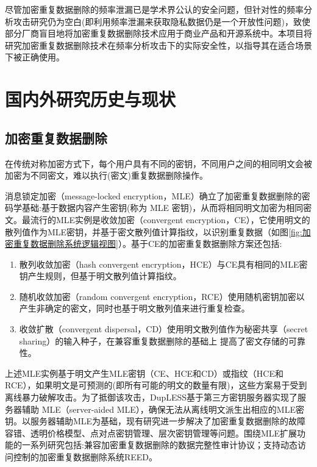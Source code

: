 尽管加密重复数据删除的频率泄漏已是学术界公认的安全问题，但针对性的频率分析攻击研究仍为空白(即利用频率泄漏来获取隐私数据仍是一个开放性问题)，致使部分厂商盲目地将加密重复数据删除技术应用于商业产品和开源系统中。本项目将研究加密重复数据删除技术在频率分析攻击下的实际安全性，以指导其在适合场景下被正确使用。


\section{国内外研究历史与现状}

\subsection{加密重复数据删除}
\label{sec:加密重复数据删除}
在传统对称加密方式下，每个用户具有不同的密钥，不同用户之间的相同明文会被加密为不同密文，难以执行(密文)重复数据删除操作。

消息锁定加密（message-locked encryption，MLE）确立了加密重复数据删除的密码学基础:基于数据内容产生密钥(称为 MLE 密钥)，从而将相同明文加密为相同密文。最流行的MLE实例是收敛加密（convergent encryption，CE），它使用明文的散列值作为MLE密钥，并基于密文散列值计算指纹，以识别重复数据（如图\ref{fig:加密重复数据删除系统逻辑视图}）。基于CE的加密重复数据删除方案还包括:

\begin{enumerate}
    \item 散列收敛加密（hash convergent encryption，HCE）与CE具有相同的MLE密钥产生规则，但基于明文散列值计算指纹。
    \item 随机收敛加密（random convergent encryption，RCE）使用随机密钥加密以产生非确定的密文，同时也基于明文散列值来进行重复检查。
    \item 收敛扩散（convergent dispersal，CD）使用明文散列值作为秘密共享（secret sharing）的输入种子，在兼容重复数据删除的基础上 提高了密文存储的可靠性。
\end{enumerate}

上述MLE实例基于明文产生MLE密钥（CE、HCE和CD）或指纹（HCE和RCE），如果明文是可预测的(即所有可能的明文的数量有限)，这些方案易于受到离线暴力破解攻击。为了抵御该攻击，DupLESS基于第三方密钥服务器实现了服务器辅助 MLE（server-aided MLE），确保无法从离线明文派生出相应的MLE密钥。以服务器辅助MLE为基础，现有研究进一步解决了加密重复数据删除的故障容错、透明价格模型、点对点密钥管理、层次密钥管理等问题。围绕MLE扩展功能的一系列研究包括:兼容加密重复数据删除的数据完整性审计协议；支持动态访问控制的加密重复数据删除系统REED。


